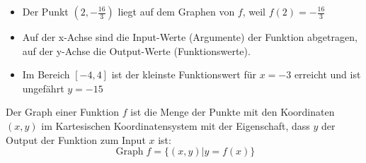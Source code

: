 \begin{itemize}
    \item Der Punkt $(2,-\frac{16}{3})$ liegt auf dem Graphen von $f$, weil $f(2)=-\frac{16}{3}$
    \item Auf der x-Achse sind die Input-Werte (Argumente) der Funktion abgetragen, auf der y-Achse die Output-Werte (Funktionswerte).
    \item Im Bereich $[-4,4]$ ist der kleinste Funktionswert für $x=-3$ erreicht und ist ungefährt $y=-15$
\end{itemize}
\begin{deff}{}
    Der Graph einer Funktion $f$ ist die Menge der Punkte mit den Koordinaten $(x,y)$ im Kartesischen Koordinatensystem mit der Eigenschaft, dass $y$ der Output der Funktion zum Input $x$ ist:
    \[\operatorname{Graph} f=\{(x,y)| y=f(x)\}\]
\end{deff}

